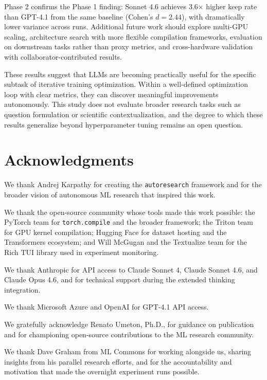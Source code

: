 \documentclass[11pt]{article}
\begin{document}
Phase 2 confirms the Phase 1 finding: Sonnet 4.6 achieves 3.6$\times$ higher keep rate than GPT-4.1 from the same baseline (Cohen's $d = 2.44$), with dramatically lower variance across runs. Additional future work should explore multi-GPU scaling, architecture search with more flexible compilation frameworks, evaluation on downstream tasks rather than proxy metrics, and cross-hardware validation with collaborator-contributed results.

These results suggest that LLMs are becoming practically useful for the specific subtask of iterative training optimization. Within a well-defined optimization loop with clear metrics, they can discover meaningful improvements autonomously. This study does not evaluate broader research tasks such as question formulation or scientific contextualization, and the degree to which these results generalize beyond hyperparameter tuning remains an open question.

\section*{Acknowledgments}
\label{sec:acknowledgments}

We thank Andrej Karpathy for creating the \texttt{autoresearch} framework and for the broader vision of autonomous ML research that inspired this work.

We thank the open-source community whose tools made this work possible: the PyTorch team for \texttt{torch.compile} and the broader framework; the Triton team for GPU kernel compilation; Hugging Face for dataset hosting and the Transformers ecosystem; and Will McGugan and the Textualize team for the Rich TUI library used in experiment monitoring.

We thank Anthropic for API access to Claude Sonnet 4, Claude Sonnet 4.6, and Claude Opus 4.6, and for technical support during the extended thinking integration.

We thank Microsoft Azure and OpenAI for GPT-4.1 API access.

We gratefully acknowledge Renato Umeton, Ph.D., for guidance on publication and for championing open-source contributions to the ML research community.

We thank Dave Graham from ML Commons for working alongside us, sharing insights from his parallel research efforts, and for the accountability and motivation that made the overnight experiment runs possible.
\end{document}
